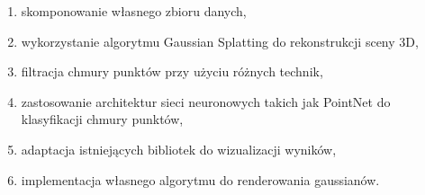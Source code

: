 \begin{enumerate}
    \item skomponowanie własnego zbioru danych, 
    \item wykorzystanie algorytmu Gaussian Splatting do rekonstrukcji sceny 3D,
    \item filtracja chmury punktów przy użyciu różnych technik, 
    \item zastosowanie architektur sieci neuronowych takich jak PointNet do klasyfikacji chmury punktów, 
    \item adaptacja istniejących bibliotek do wizualizacji wyników, 
    \item implementacja własnego algorytmu do renderowania gaussianów.
\end{enumerate}
